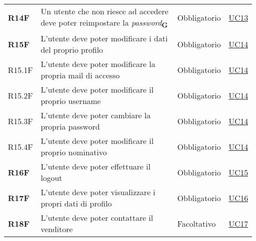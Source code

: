 \begin{center}
\begin{longtable}[!h]{p{50px} p{245px} p{75px} p{50px}}
        \textbf{R14F}                         & Un utente che non riesce ad accedere deve poter reimpostare la \textit{password}\textsubscript{\textbf{G}}                                             & Obbligatorio             & \hyperref[sec:UC13]{UC13}                    \\
        \textbf{R15F}                         & L'utente deve poter modificare i dati del proprio profilo                                                                                              & Obbligatorio             & \hyperref[sec:UC14]{UC14}                    \\
        R15.1F                                & L'utente deve poter modificare la propria mail di accesso                                                                                              & Obbligatorio             & \hyperref[sec:UC14]{UC14}                    \\
        R15.2F                                & L'utente deve poter modificare il proprio username                                                                                                     & Obbligatorio             & \hyperref[sec:UC14]{UC14}                    \\
        R15.3F                                & L'utente deve poter cambiare la propria password                                                                                                       & Obbligatorio             & \hyperref[sec:UC14]{UC14}                    \\
        R15.4F                                & L'utente deve poter modificare il proprio nominativo                                                                                                   & Obbligatorio             & \hyperref[sec:UC14]{UC14}                    \\
        \textbf{R16F}                         & L'utente deve poter effettuare il logout                                                                                                               & Obbligatorio             & \hyperref[sec:UC15]{UC15}                    \\
        \textbf{R17F}                         & L'utente deve poter visualizzare i propri dati di profilo                                                                                              & Obbligatorio             & \hyperref[sec:UC16]{UC16}                    \\
        \textbf{R18F}                         & L'utente deve poter contattare il venditore                                                                                                            & Facoltativo              & \hyperref[sec:UC17]{UC17}                    \\

\end{longtable}
\end{center}
